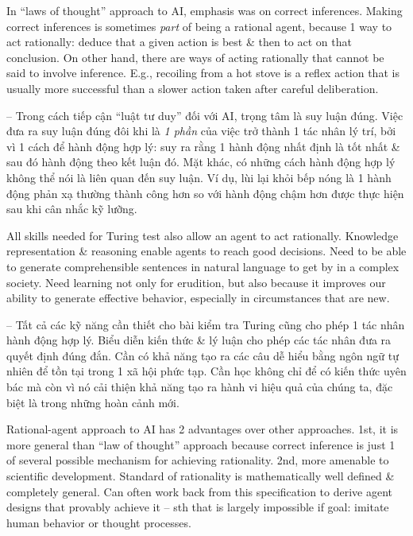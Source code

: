 \documentclass{article}
\begin{document}
\begin{itemize}
\begin{itemize}
\begin{itemize}
\begin{itemize}
				In ``laws of thought'' approach to AI, emphasis was on correct inferences. Making correct inferences is sometimes {\it part}  of being a rational agent, because 1 way to act rationally: deduce that a given action is best \& then to act on that conclusion. On other hand, there are ways of acting rationally that cannot be said to involve inference. E.g., recoiling from a hot stove is a reflex action that is usually more successful than a slower action taken after careful deliberation.
				
				-- Trong cách tiếp cận ``luật tư duy'' đối với AI, trọng tâm là suy luận đúng. Việc đưa ra suy luận đúng đôi khi là {\it 1 phần} của việc trở thành 1 tác nhân lý trí, bởi vì 1 cách để hành động hợp lý: suy ra rằng 1 hành động nhất định là tốt nhất \& sau đó hành động theo kết luận đó. Mặt khác, có những cách hành động hợp lý không thể nói là liên quan đến suy luận. Ví dụ, lùi lại khỏi bếp nóng là 1 hành động phản xạ thường thành công hơn so với hành động chậm hơn được thực hiện sau khi cân nhắc kỹ lưỡng.
				
				All skills needed for Turing test also allow an agent to act rationally. Knowledge representation \& reasoning enable agents to reach good decisions. Need to be able to generate comprehensible sentences in natural language to get by in a complex society. Need learning not only for erudition, but also because it improves our ability to generate effective behavior, especially in circumstances that are new.
				
				-- Tất cả các kỹ năng cần thiết cho bài kiểm tra Turing cũng cho phép 1 tác nhân hành động hợp lý. Biểu diễn kiến thức \& lý luận cho phép các tác nhân đưa ra quyết định đúng đắn. Cần có khả năng tạo ra các câu dễ hiểu bằng ngôn ngữ tự nhiên để tồn tại trong 1 xã hội phức tạp. Cần học không chỉ để có kiến thức uyên bác mà còn vì nó cải thiện khả năng tạo ra hành vi hiệu quả của chúng ta, đặc biệt là trong những hoàn cảnh mới.
				
				Rational-agent approach to AI has 2 advantages over other approaches. 1st, it is more general than ``law of thought'' approach because correct inference is just 1 of several possible mechanism for achieving rationality. 2nd, more amenable to scientific development. Standard of rationality is mathematically well defined \& completely general. Can often work back from this specification to derive agent designs that provably achieve it -- sth that is largely impossible if goal: imitate human behavior or thought processes.
				

\end{itemize}
\end{itemize}
\end{itemize}
\end{itemize}
\end{document}
